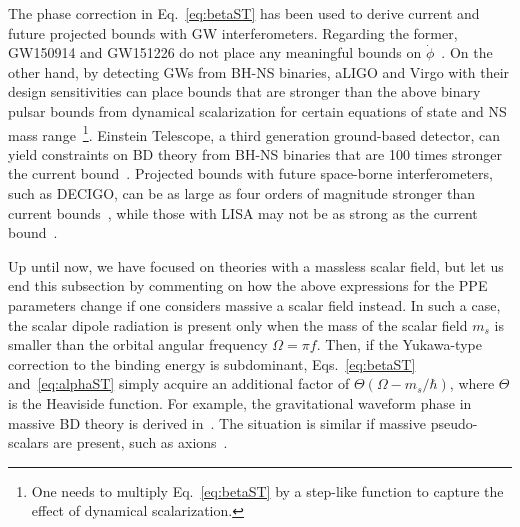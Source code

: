 \documentclass[prd,twocolumn,nofootinbib]{revtex4-1}
\begin{document}
The phase correction in Eq.~\eqref{eq:betaST} has been used to derive current and future projected bounds with GW interferometers. Regarding the former, GW150914 and GW151226 do not place any meaningful bounds on $\dot \phi$~\cite{Yunes:2016jcc}. On the other hand, by detecting GWs from BH-NS binaries, aLIGO and Virgo with their design sensitivities can place bounds that are stronger than the above binary pulsar bounds from dynamical scalarization for certain equations of state and NS mass range~\cite{Shibata:2013pra,Taniguchi:2014fqa,Sampson:2014qqa,Shao:2017gwu}\footnote{One needs to multiply Eq.~\eqref{eq:betaST} by a step-like function to capture the effect of dynamical scalarization.}. Einstein Telescope, a third generation ground-based detector, can yield constraints on BD theory from BH-NS binaries that are 100 times stronger the current bound~\cite{Zhang:2017sym}. Projected bounds with future space-borne interferometers, such as DECIGO, can be as large as four orders of magnitude stronger than current bounds~\cite{Yagi:2009zz}, while those with LISA may not be as strong as the current bound~\cite{Berti:2004bd,Yagi:2009zm}. 




Up until now, we have focused on theories with a massless scalar field, but let us end this subsection by commenting on how the above expressions for the PPE parameters change if one considers massive a scalar field instead. In such a case, the scalar dipole radiation is present only when the mass of the scalar field $m_s$ is smaller than the orbital angular frequency $\Omega= \pi f$. Then, if the Yukawa-type correction to the binding energy is subdominant, Eqs.~\eqref{eq:betaST} and~\eqref{eq:alphaST} simply acquire an additional factor of $\Theta(\Omega - m_s/\hbar)$, where $\Theta$ is the Heaviside function. For example, the gravitational waveform phase in massive BD theory is derived in~\cite{Berti:2012bp}. The situation is similar if massive pseudo-scalars are present, such as axions~\cite{Huang:2018pbu}.
 
\end{document}
